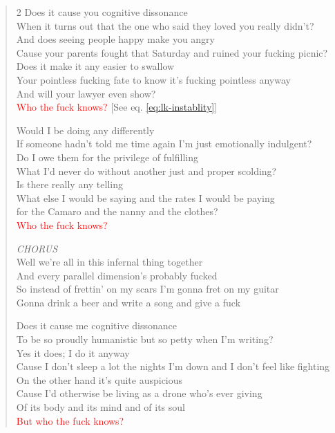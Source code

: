 \documentclass[11pt]{book}
\begin{document}
\begin{verse}
\begin{multicols}{2}
\tiny
Does it cause you cognitive dissonance\\
When it turns out that the one who said they loved you really didn't?\\
And does seeing people happy make you angry\\
Cause your parents fought that Saturday and ruined your fucking picnic?\\
Does it make it any easier to swallow\\
Your pointless fucking fate to know it's fucking pointless anyway\\
And will your lawyer even show?\\
\textcolor{Red}{Who the fuck knows?} [See eq. \ref{eq:lk-instablity}]

Would I be doing any differently\\
If someone hadn't told me time again I'm just emotionally indulgent?\\
Do I owe them for the privilege of fulfilling\\
What I'd never do without another just and proper scolding?\\
Is there really any telling\\
What else I would be saying and the rates I would be paying\\
for the Camaro and the nanny and the clothes?\\
\textcolor{Red}{Who the fuck knows?}

\hspace{2em} \emph{CHORUS}\\
\hspace{2em} Well we're all in this infernal thing together \\
\hspace{2em} And every parallel dimension's probably fucked \\
\hspace{2em} So instead of frettin' on my scars I'm gonna fret on my guitar \\
\hspace{2em} Gonna drink a beer and write a song and give a fuck

Does it cause me cognitive dissonance \\
To be so proudly humanistic but so petty when I'm writing? \\
Yes it does; I do it anyway \\
Cause I don't sleep a lot the nights I'm down and I don't feel like fighting \\
On the other hand it's quite auspicious \\
Cause I'd otherwise be living as a drone who's ever giving \\
Of its body and its mind and of its soul \\
\textcolor{Red}{But who the fuck knows?}


\end{multicols}
\end{verse}
\end{document}
